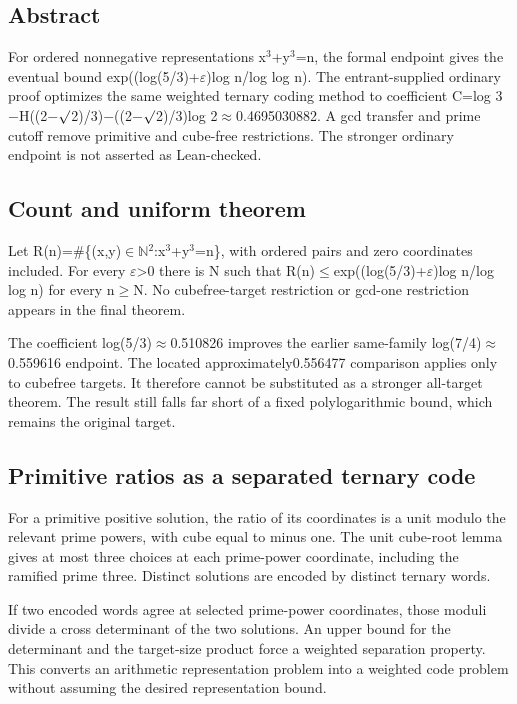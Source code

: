 \documentclass[11pt,a4paper]{article}
\begin{document}
\subsection{Abstract}
For ordered nonnegative representations x\ensuremath{^3}+y\ensuremath{^3}=n, the formal endpoint gives the eventual bound exp((log(5/3)+\ensuremath{\varepsilon})log n/log log n). The entrant-supplied ordinary proof optimizes the same weighted ternary coding method to coefficient C=log 3\ensuremath{-}H((2\ensuremath{-}\ensuremath{\surd}2)/3)\ensuremath{-}((2\ensuremath{-}\ensuremath{\surd}2)/3)log 2\ensuremath{\approx}0.4695030882. A gcd transfer and prime cutoff remove primitive and cube-free restrictions. The stronger ordinary endpoint is not asserted as Lean-checked.

\subsection{Count and uniform theorem}
Let R(n)=\#\{(x,y)\ensuremath{\in}\ensuremath{\mathbb{N}}\ensuremath{^2}:x\ensuremath{^3}+y\ensuremath{^3}=n\}, with ordered pairs and zero coordinates included. For every \ensuremath{\varepsilon}>0 there is N such that R(n)\ensuremath{\leq}exp((log(5/3)+\ensuremath{\varepsilon})log n/log log n) for every n\ensuremath{\geq}N. No cubefree-target restriction or gcd-one restriction appears in the final theorem.

The coefficient log(5/3)\ensuremath{\approx}0.510826 improves the earlier same-family log(7/4)\ensuremath{\approx}0.559616 endpoint. The located approximately0.556477 comparison applies only to cubefree targets. It therefore cannot be substituted as a stronger all-target theorem. The result still falls far short of a fixed polylogarithmic bound, which remains the original target.

\subsection{Primitive ratios as a separated ternary code}
For a primitive positive solution, the ratio of its coordinates is a unit modulo the relevant prime powers, with cube equal to minus one. The unit cube-root lemma gives at most three choices at each prime-power coordinate, including the ramified prime three. Distinct solutions are encoded by distinct ternary words.

If two encoded words agree at selected prime-power coordinates, those moduli divide a cross determinant of the two solutions. An upper bound for the determinant and the target-size product force a weighted separation property. This converts an arithmetic representation problem into a weighted code problem without assuming the desired representation bound.
\end{document}
